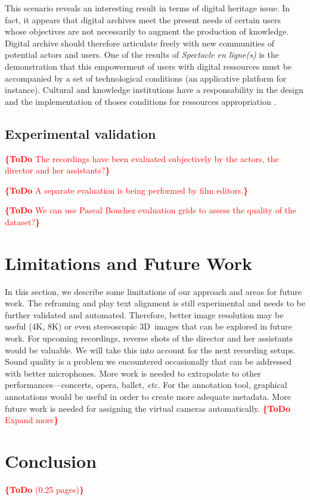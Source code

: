 \documentclass[conference]{IEEEtran}
\newcommand{\todo}[1]{\noindent\textcolor{red}{{\bf \{ToDo} #1{\bf \}}}}
\begin{document}
This scenario reveals an interesting result in terms of digital heritage issue. In fact, it appears that digital archives meet the present needs of certain users whose objectives are not necessarily to augment the production of knowledge. Digital archive should therefore articulate freely with new communities of potential actors and users. One of the results of \emph{Spectacle en ligne(s)} is the demonstration that this empowerment of users with digital ressources must be accompanied by a set of technological conditions (an applicative platform for instance). Cultural and knowledge institutions have a responsability in the design and the implementation of thoses conditions for ressources appropriation \cite{sauret2015}.

\subsection{Experimental validation}
\todo{The recordings have been evaluated subjectively by the actors, the director and her assistants?}

\todo{A separate evaluation is being performed by film editors.}

\todo{We can use Pascal Bouchez evaluation grids to assess the quality of the dataset?}


\section{Limitations and Future  Work}
\label{sec:limitations}

In this section, we describe some limitations of our approach and areas for future work.
The reframing and play text alignment is still experimental
and needs to be further validated and automated.
Therefore, better image resolution may be useful (4K, 8K)
or even stereoscopic 3D~images that can be explored in future work.
For upcoming recordings, reverse shots of the director and her assistants would be valuable.
We will take this into account for the next recording setups.
Sound quality is a problem we encountered occasionally that can be addressed with better microphones.
More work is needed to extrapolate to other performances---concerts, opera, ballet, \emph{etc.}
For the annotation tool, graphical annotations would be useful
in order to create more adequate metadata.
More future work is needed for assigning the virtual cameras automatically.
\todo{Expand more}

\section{Conclusion}
\label{sec:conclusion}
\todo{(0.25 pages)}
\end{document}
